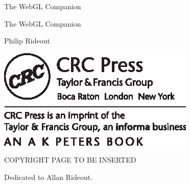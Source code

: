 \vspace*{1in}

 \begin{flushright}
 \setlength{\baselineskip}{30pt}
 {\MTSMALL The WebGL Companion}
 \end{flushright}

\newpage

\phantom{Xx}

\newpage


 \begin{flushright}
 \setlength{\baselineskip}{36pt}
 {{\MT The WebGL Companion}\\{\MTSUB }}

\vspace{1in}

 \setlength{\baselineskip}{22pt}
 {\MTA Philip Rideout}

\vfill

\includegraphics{AKPeters_TitlePageLogo.eps}

 \end{flushright}

\newpage

COPYRIGHT PAGE TO BE INSERTED

\newpage


\vspace*{1in}


\begin{flushright}
 \setlength{\baselineskip}{13.5pt}
{\MTD Dedicated to Allan Rideout.}
\end{flushright}

\newpage
\strut
